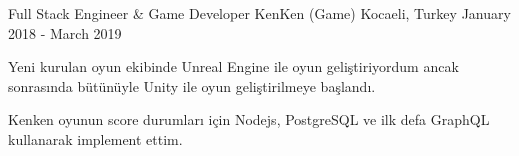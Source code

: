 \begin{cventries}
    \cventry
    {Full Stack Engineer \& Game Developer}
    {KenKen (Game)}
    {Kocaeli, Turkey}
    {January 2018 - March 2019}
    {
      \begin{cvitems}
        \item{Yeni kurulan oyun ekibinde Unreal Engine ile oyun geliştiriyordum ancak sonrasında bütünüyle Unity ile oyun geliştirilmeye başlandı.}
        \item{Kenken oyunun score durumları için Nodejs, PostgreSQL ve ilk defa GraphQL kullanarak implement ettim.}
      \end{cvitems}
    }
\end{cventries}
